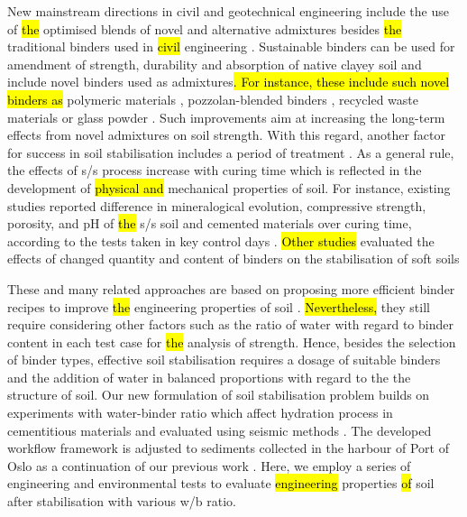 \documentclass[sustainability,article,submit,pdftex,moreauthors]{Definitions/mdpi}
\begin{document}
New mainstream directions in civil and geotechnical engineering include the use of \hl{the }optimised blends of novel and alternative admixtures besides \hl{the }traditional binders used in \hl{civil }engineering \cite{NAGY,Yi,Ismail,Lametal2018}. Sustainable binders can be used for amendment of strength, durability and absorption of native clayey soil and include novel binders used as admixtures\hl{. For instance, these include such novel binders as} polymeric materials \cite{geotechnics1020021,Moustafa,LIU2023101044}, pozzolan-blended binders \cite{Consoli}, recycled waste materials \cite{TABASSUM2022100880} or glass powder \cite{Filho}. Such improvements aim at increasing the long-term effects from novel admixtures on soil strength. With this regard, another factor for success in soil stabilisation includes a period of treatment \cite{Howard,Romera}. As a general rule, the effects of s/s process increase with curing time which is reflected in the development of \hl{physical and }mechanical properties of soil. For instance, existing studies reported difference in mineralogical evolution, compressive strength, porosity, and pH of \hl{the }s/s soil and cemented materials over curing time, according to the tests taken in key control days \cite{Chrysochoouetal2010,Shrestha}. \hl{Other studies} evaluated\hl{ }the effects of changed quantity and content of binders on the stabilisation of soft soils \cite{Oliveiraetal2014,Oliveiraetal2013}

These and many related approaches are based on proposing more efficient binder recipes to improve \hl{the }engineering properties of soil \cite{Khajeh,HUANG2022126702,Hallal}. \hl{Nevertheless,} they still require considering other factors such as the ratio of water with regard to binder content in each test case for \hl{the }analysis of strength. Hence, besides the selection of binder types,\hl{ }effective soil stabilisation requires a dosage of suitable binders and the addition of water in balanced proportions with regard to the the structure of soil. Our new formulation of soil stabilisation problem builds on experiments with water-binder ratio which affect hydration process in cementitious materials and evaluated using seismic methods \cite{Guoetal2021,CHI2021138699}. The developed workflow framework is adjusted to sediments collected in the harbour of Port of Oslo as a continuation of our previous work \cite{a16060303}. Here, we employ a series of engineering and environmental tests to evaluate \hl{engineering }properties \hl{of} soil after stabilisation with various w/b ratio.
\end{document}
